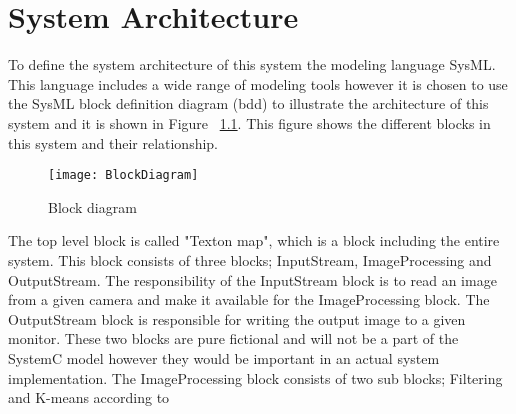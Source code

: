 \chapter{System Architecture}

To define the system architecture of this system the modeling language SysML. This language includes a wide range of modeling tools however it is chosen to use the SysML block definition diagram (bdd) to illustrate the architecture of this system and it is shown in Figure ~\ref{fig:BlockDiagram}. This figure shows the different blocks in this system and their relationship. 

\begin{figure}[H]
\centering
\texttt{[image: BlockDiagram]}
\caption{Block diagram}
\label{fig:BlockDiagram}
\end{figure}

The top level block is called "Texton map", which is a block including the entire system. This block consists of three blocks; InputStream, ImageProcessing and OutputStream. The responsibility of the InputStream block is to read an image from a given camera and make it available for the ImageProcessing block. The OutputStream block is responsible for writing the output image to a given monitor. These two blocks are pure fictional and will not be a part of the SystemC model however they would be important in an actual system implementation. The ImageProcessing block consists of two sub blocks; Filtering and K-means according to 